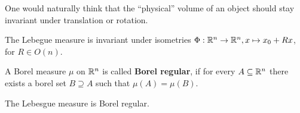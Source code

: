 One would naturally think that the ``physical'' volume of an object should stay invariant under translation or rotation.
\begin{thm}[]
  The Lebegue measure is invariant under isometries $\Phi: \mathbb{R}^{n} \to \mathbb{R}^{n}, x \mapsto x_0 + Rx$, for $R \in O(n)$.
\end{thm}


\begin{dfn}[]
  A Borel measure $\mu$ on $\mathbb{R}^{n}$ is called \textbf{Borel regular}, if for every $A \subseteq \mathbb{R}^{n}$ there exists a borel set $B \supseteq A$ such that $\mu(A) = \mu(B)$.
\end{dfn}
The Lebesgue measure is Borel regular.



